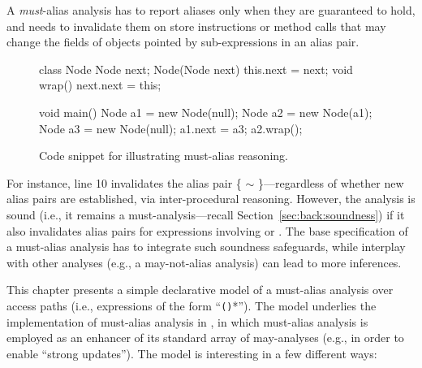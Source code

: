 A \emph{must}-alias analysis has to report aliases only when they are guaranteed to hold, and needs to invalidate them on store instructions or method calls that may change the fields of objects pointed by sub-expressions in an alias pair.

\begin{figure}[htb!p]
\begin{javacode}
class Node {
	Node next;
	Node(Node next) { this.next = next; }
	void wrap() { next.next = this; }
}

void main() {
	Node a1 = new Node(null);
	Node a2 = new Node(a1);
	Node a3 = new Node(null);
	a1.next = a3;
	a2.wrap();
}
\end{javacode}
\caption{Code snippet for illustrating must-alias reasoning.}
\label{fig:must-logic:snippet}
\end{figure}

For instance, line 10 invalidates the alias pair \{ $\sim$ \}---regardless of whether new alias pairs are established, via inter-procedural reasoning. However, the analysis is sound (i.e., it remains a must-analysis---recall Section~\ref{sec:back:soundness}) if it also invalidates alias pairs for expressions involving  or . The base specification of a must-alias analysis has to integrate such soundness safeguards, while interplay with other analyses (e.g., a may-not-alias analysis) can lead to more inferences.

This chapter presents a simple declarative model of a must-alias analysis over access paths (i.e., expressions of the form ``\texttt{()}*''). The model underlies the implementation of must-alias analysis in \doop{}, in which must-alias analysis is employed as an enhancer of its standard array of may-analyses (e.g., in order to enable ``strong updates''). The model is interesting in a few different ways:


